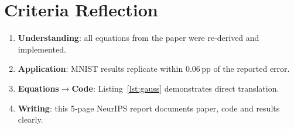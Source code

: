 \documentclass{article}
\begin{document}
\section*{Criteria Reflection}
\begin{enumerate}
\item \textbf{Understanding}: all equations from the paper were re‑derived and implemented.
\item \textbf{Application}: MNIST results replicate within $0.06$\,pp of the reported error.
\item \textbf{Equations$\rightarrow$Code}: Listing~\ref{lst:gauss} demonstrates direct translation.
\item \textbf{Writing}: this 5‑page NeurIPS report documents paper, code and results clearly.
\end{enumerate}



\end{document}
